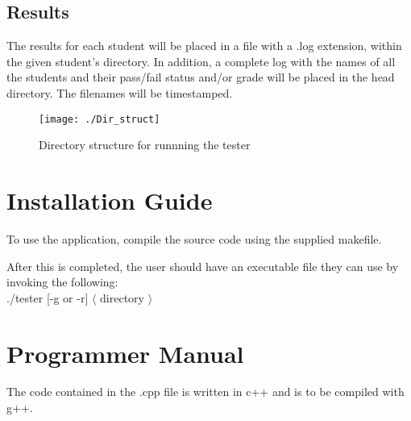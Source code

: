 \subsection{Results}
The results for each student will be placed in a file with a .log extension, within the given student's directory. 
In addition, a complete log with the names of all the students and their pass/fail status and/or grade will be placed 
in the head directory. The filenames will be timestamped.

\begin{figure}[H]
\begin{center}
\texttt{[image: ./Dir\_struct]}
\end{center}
\caption{Directory structure for runnning the tester \label{dir}}
\end{figure}

\section{Installation Guide}
To use the application, compile the source code using the supplied makefile.

After this is completed, the user should have an
executable file they can use by invoking the following: \\
./tester [-g or -r] $\langle$ directory $\rangle$

\section{Programmer Manual}
The code contained in the .cpp file is written in c++ and is to be compiled with g++. 
